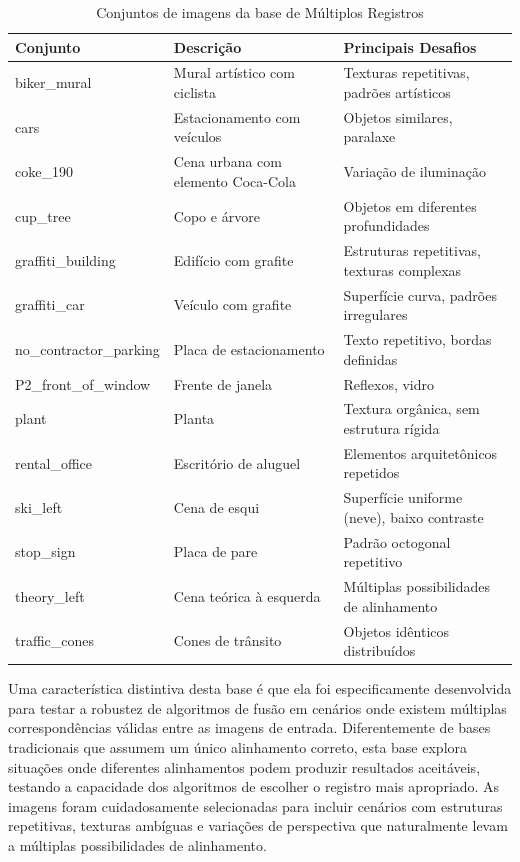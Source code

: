 \begin{table}[htb]
\centering
\caption{Conjuntos de imagens da base de Múltiplos Registros}
\label{tab:conjuntos_multiplos}
\small
\begin{tabular}{lp{5cm}p{5cm}}
\hline
\textbf{Conjunto} & \textbf{Descrição} & \textbf{Principais Desafios} \\
\hline
biker\_mural & Mural artístico com ciclista & Texturas repetitivas, padrões artísticos \\
cars & Estacionamento com veículos & Objetos similares, paralaxe \\
coke\_190 & Cena urbana com elemento Coca-Cola & Variação de iluminação \\
cup\_tree & Copo e árvore & Objetos em diferentes profundidades \\
graffiti\_building & Edifício com grafite & Estruturas repetitivas, texturas complexas \\
graffiti\_car & Veículo com grafite & Superfície curva, padrões irregulares \\
no\_contractor\_parking & Placa de estacionamento & Texto repetitivo, bordas definidas \\
P2\_front\_of\_window & Frente de janela & Reflexos, vidro \\
plant & Planta & Textura orgânica, sem estrutura rígida \\
rental\_office & Escritório de aluguel & Elementos arquitetônicos repetidos \\
ski\_left & Cena de esqui & Superfície uniforme (neve), baixo contraste \\
stop\_sign & Placa de pare & Padrão octogonal repetitivo \\
theory\_left & Cena teórica à esquerda & Múltiplas possibilidades de alinhamento \\
traffic\_cones & Cones de trânsito & Objetos idênticos distribuídos \\
\hline
\end{tabular}
\end{table}

Uma característica distintiva desta base é que ela foi especificamente desenvolvida para testar a robustez de algoritmos de fusão em cenários onde existem múltiplas correspondências válidas entre as imagens de entrada. Diferentemente de bases tradicionais que assumem um único alinhamento correto, esta base explora situações onde diferentes alinhamentos podem produzir resultados aceitáveis, testando a capacidade dos algoritmos de escolher o registro mais apropriado. As imagens foram cuidadosamente selecionadas para incluir cenários com estruturas repetitivas, texturas ambíguas e variações de perspectiva que naturalmente levam a múltiplas possibilidades de alinhamento.

